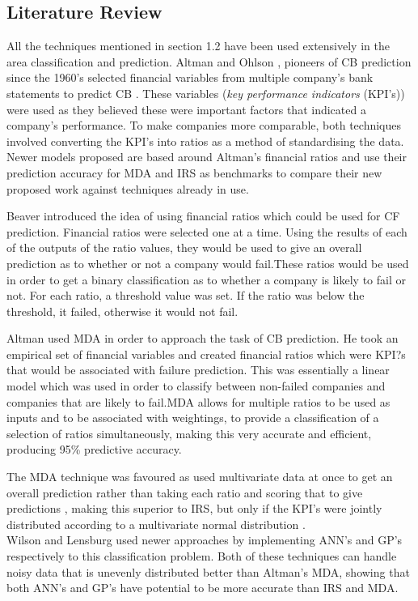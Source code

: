 \documentclass[11pt]{article}
\begin{document}
\subsection{Literature Review}
All the techniques mentioned in section 1.2 have been used extensively in the area classification and prediction. Altman and Ohlson , pioneers of CB prediction since the 1960's selected financial variables from multiple company's bank statements to predict CB \cite{?}. These variables (\textit{key performance indicators} (KPI's)) were used as they believed these were important factors that indicated a company's performance. To make companies more comparable, both techniques involved converting the KPI's into ratios as a method of standardising the data. Newer models proposed are based around Altman's financial ratios and use their prediction accuracy for MDA and IRS as benchmarks to compare their new proposed work against techniques already in use. 


Beaver introduced the idea of using financial ratios which could be used for CF prediction. Financial ratios were selected one at a time. Using the results of each of the outputs of the ratio values, they would be used to give an overall prediction as to whether or not a company would fail.These ratios would be used in order to get a binary classification as to whether a company is likely to fail or not. For each ratio, a threshold value was set. If the ratio was below the threshold, it failed, otherwise it would not fail.


Altman used MDA in order to approach the task of CB prediction. He took an empirical set of financial variables and created financial ratios which were KPI?s that would be associated with failure prediction. This was essentially a linear model which was used in order to classify between non-failed companies and companies that are likely to fail.MDA allows for multiple ratios to be used as inputs and to be associated with weightings, to provide a classification of a selection of ratios simultaneously, making this very accurate and efficient, producing 95\% predictive accuracy. 

The MDA technique was favoured as used multivariate data at once to get an overall prediction rather than taking each ratio and scoring that to give predictions \cite{?}, making this superior to IRS, but only if the KPI's were jointly distributed according to a multivariate normal distribution \cite{?}. \\
Wilson  \cite{?}and Lensburg \cite{?} used newer approaches by implementing ANN's and GP's respectively to this classification problem. Both of these techniques can handle noisy data that is unevenly distributed better than Altman's MDA, showing that both ANN's and GP's have potential to be more accurate than IRS and MDA. 
\end{document}
